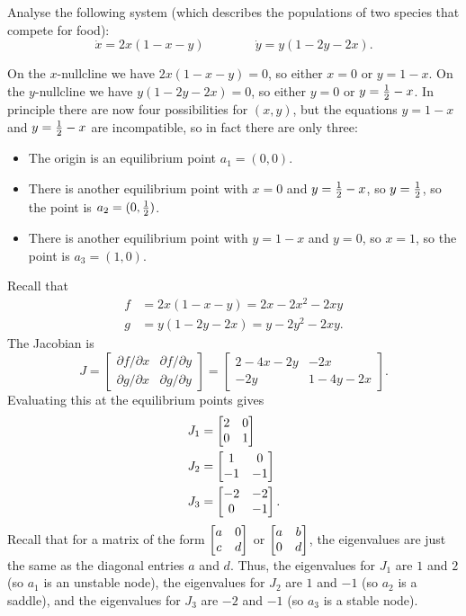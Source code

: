 \documentclass[a4paper]{amsart}
\begin{document}
\begin{exercise}\label{ex-competition}
 Analyse the following system (which describes the populations of two
 species that compete for food):
 \[ \dot{x} = 2x(1-x-y) \hspace{4em} \dot{y} = y(1-2y-2x). \]
\end{exercise}
\begin{solution}
 On the $x$-nullcline we have $2x(1-x-y)=0$, so either $x=0$ or
 $y=1-x$.  On the $y$-nullcline we have $y(1-2y-2x)=0$, so either
 $y=0$ or $y=\tfrac{1}{2}-x$.  In principle there are now four possibilities
 for $(x,y)$, but the equations $y=1-x$ and $y=\tfrac{1}{2}-x$ are
 incompatible, so in fact there are only three:
 \begin{itemize}
  \item The origin is an equilibrium point $a_1=(0,0)$.
  \item There is another equilibrium point with $x=0$ and $y=\tfrac{1}{2}-x$, so
   $y=\tfrac{1}{2}$, so the point is $a_2=(0,\tfrac{1}{2})$.
  \item There is another equilibrium point with $y=1-x$ and $y=0$,
   so $x=1$, so the point is $a_3=(1,0)$.
 \end{itemize}
 Recall that 
 \begin{align*}
  f &= 2x(1-x-y) = 2x - 2x^2 - 2xy \\
  g &= y(1-2y-2x) = y - 2y^2 - 2xy.
 \end{align*}
 The Jacobian is 
 \[ J = \left[\begin{array}{cc} \partial f/\partial x & \partial f/\partial y \\
             \partial g/\partial x & \partial g/\partial y \end{array}\right]
      = \left[\begin{array}{cc} 2-4x-2y & -2x \\ -2y & 1-4y-2x \end{array}\right].
 \]
 Evaluating this at the equilibrium points gives
 \begin{align*}
  J_1 &= \left[\begin{matrix} 2 & 0 \\ 0 & 1 \end{matrix}\right] \\
  J_2 &= \left[\begin{matrix} 1 & 0 \\ -1 & -1 \end{matrix}\right] \\
  J_3 &= \left[\begin{matrix} -2 & -2 \\ 0 & -1 \end{matrix}\right].
 \end{align*}
 Recall that for a matrix of the form $\left[\begin{matrix} a&0\\ c&d\end{matrix}\right]$ or
 $\left[\begin{matrix} a&b\\ 0&d\end{matrix}\right]$, the eigenvalues are just the same as the
 diagonal entries $a$ and $d$.  Thus, the eigenvalues for $J_1$ are
 $1$ and $2$ (so $a_1$ is an unstable node), the eigenvalues for $J_2$
 are $1$ and $-1$ (so $a_2$ is a saddle), and the eigenvalues for $J_3$
 are $-2$ and $-1$ (so $a_3$ is a stable node).


\end{solution}
\end{document}
